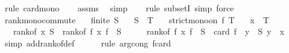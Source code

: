 \begin{isabellebody}
\ {\isacharparenleft}{\kern0pt}rule\ card{\isacharunderscore}{\kern0pt}mono{\isacharparenright}{\kern0pt}\isanewline
\ \ \isamarkupfalse%
\ assms\ \isamarkupfalse%
\ simp\isanewline
\ \ \isamarkupfalse%
\ {\isacharparenleft}{\kern0pt}rule\ subsetI{\isacharcomma}{\kern0pt}\ simp{\isacharcomma}{\kern0pt}\ force{\isacharparenright}{\kern0pt}%
\endisatagproof
{\isafoldproof}%
%
\isadelimproof
\isanewline
%
\endisadelimproof
\isanewline
{}\isamarkupfalse%
\ rank{\isacharunderscore}{\kern0pt}mono{\isacharunderscore}{\kern0pt}commute{\isacharcolon}{\kern0pt}\isanewline
\ \ \ {\isachardoublequoteopen}finite\ S{\isachardoublequoteclose}\isanewline
\ \ \ {\isachardoublequoteopen}S\ {\isasymsubseteq}\ T{\isachardoublequoteclose}\isanewline
\ \ \ {\isachardoublequoteopen}strict{\isacharunderscore}{\kern0pt}mono{\isacharunderscore}{\kern0pt}on\ f\ T{\isachardoublequoteclose}\isanewline
\ \ \ {\isachardoublequoteopen}x\ {\isasymin}\ T{\isachardoublequoteclose}\isanewline
\ \ \ {\isachardoublequoteopen}rank{\isacharunderscore}{\kern0pt}of\ x\ S\ {\isacharequal}{\kern0pt}\ rank{\isacharunderscore}{\kern0pt}of\ {\isacharparenleft}{\kern0pt}f\ x{\isacharparenright}{\kern0pt}\ {\isacharparenleft}{\kern0pt}f\ {\isacharbackquote}{\kern0pt}\ S{\isacharparenright}{\kern0pt}{\isachardoublequoteclose}\isanewline
%
\isadelimproof
%
\endisadelimproof
%
\isatagproof
{}\isamarkupfalse%
\ {\isacharminus}{\kern0pt}\isanewline
\ \ \isamarkupfalse%
\ {\isachardoublequoteopen}rank{\isacharunderscore}{\kern0pt}of\ {\isacharparenleft}{\kern0pt}f\ x{\isacharparenright}{\kern0pt}\ {\isacharparenleft}{\kern0pt}f\ {\isacharbackquote}{\kern0pt}\ S{\isacharparenright}{\kern0pt}\ {\isacharequal}{\kern0pt}\ card\ {\isacharparenleft}{\kern0pt}f\ {\isacharbackquote}{\kern0pt}\ {\isacharbraceleft}{\kern0pt}y\ {\isasymin}\ S{\isachardot}{\kern0pt}\ y\ {\isacharless}{\kern0pt}\ x{\isacharbraceright}{\kern0pt}{\isacharparenright}{\kern0pt}{\isachardoublequoteclose}\isanewline
\ \ \ \ \isamarkupfalse%
\ {\isacharparenleft}{\kern0pt}simp\ add{\isacharcolon}{\kern0pt}rank{\isacharunderscore}{\kern0pt}of{\isacharunderscore}{\kern0pt}def{\isacharparenright}{\kern0pt}\isanewline
\ \ \ \ \isamarkupfalse%
\ {\isacharparenleft}{\kern0pt}rule\ arg{\isacharunderscore}{\kern0pt}cong{\isacharbrackleft}{\kern0pt}\ f{\isacharequal}{\kern0pt}{\isachardoublequoteopen}card{\isachardoublequoteclose}{\isacharbrackright}{\kern0pt}{\isacharparenright}{\kern0pt}\isanewline

\end{isabellebody}

